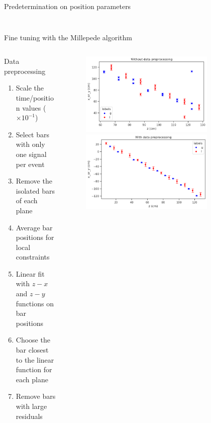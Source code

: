 \documentclass{ikpKoeln}
\begin{document}
\begin{frame}[t]{Predetermination on position parameters}
\begin{columns}[t]
\begin{column}[t]{0.48\textwidth}
{\begin{figure}[t]
				\end{figure}
			}
		\end{column}
	\end{columns}
\end{frame}

\begin{frame}[t]{Fine tuning with the Millepede algorithm}
	\vspace*{-1.2em}
	\begin{columns}[t]
		\begin{column}[t]{0.48 \textwidth}
			\begin{block}{Data preprocessing}
				\begin{enumerate}
					\item Scale the time/position values ($\times 10^{-1}$)
					\item Select bars with only one signal per event
					\item Remove the isolated bars of each plane
					\item Average bar positions for local constraints
					\item Linear fit with $z-x$ and $z-y$ functions on bar positions
					\item Choose the bar closest to the linear function for each plane
					\item Remove bars with large residuals
				\end{enumerate}
			\end{block}
		\end{column}
		\begin{column}[t]{0.48 \textwidth}
			\vspace*{-1em}
			\begin{figure}[t]
				\includegraphics[width = 0.8\textwidth]{R3BCon2024GSI/local_unfit.png}
				\includegraphics[width = 0.8\textwidth]{R3BCon2024GSI/local_fit.png}

\end{figure}
\end{column}
\end{columns}
\end{frame}
\end{document}
